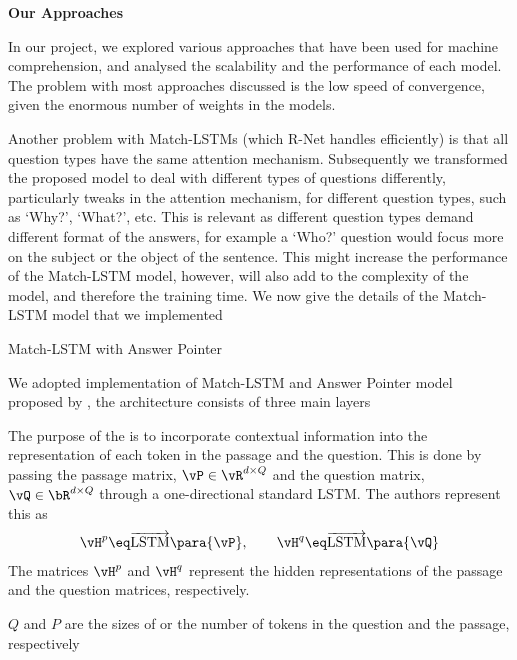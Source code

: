 \documentclass{article}
\begin{document}
\begin{psection}{\textbf{Our Approaches}}

	In our project, we explored various approaches that have been used for machine comprehension, and analysed the scalability and the performance of each model. The problem with most approaches discussed is the low speed of convergence, given the enormous number of weights in the models.

	Another problem with Match-LSTMs (which R-Net handles efficiently) is that all question types have the same attention mechanism. Subsequently we transformed the proposed model to deal with different types of questions differently, particularly tweaks in the attention mechanism, \ie for different question types, such as `Why?', `What?', etc.
	This is relevant as different question types demand different format of the answers, for example a `Who?' question would focus more on the subject or the object of the sentence. This might increase the performance of the Match-LSTM model, however, will also add to the complexity of the model, and therefore the training time. We now give the details of the Match-LSTM model that we implemented

\begin{psubsection}{Match-LSTM with Answer Pointer}\label{match-lstm}

        We adopted implementation of Match-LSTM and Answer Pointer model proposed by , the architecture consists of three main layers
		\begin{enumerate}[label=\bt{\theenumi.}]
				The purpose of the  is to incorporate contextual information into the representation of each token in the passage and the question.
				This is done by passing the passage matrix, $\vP \in \vR^{d \times Q}$ and the question matrix, $\vQ \in \bR^{d \times Q}$ through a one-directional standard LSTM.
				The authors represent this as
				\begin{align*}
					\vH^p	\eq	\overrightarrow{\text{LSTM}}\para{\vP}, \quad\quad
					\vH^q	\eq	\overrightarrow{\text{LSTM}}\para{\vQ}
				\end{align*}
				The matrices $\vH^p$ and $\vH^q$ represent the hidden representations of the passage and the question matrices, respectively.

				\begin{note}
					$Q$ and $P$ are the sizes of or the number of tokens in the question and the passage, respectively
				\end{note}


\end{enumerate}
\end{psubsection}
\end{psection}
\end{document}
